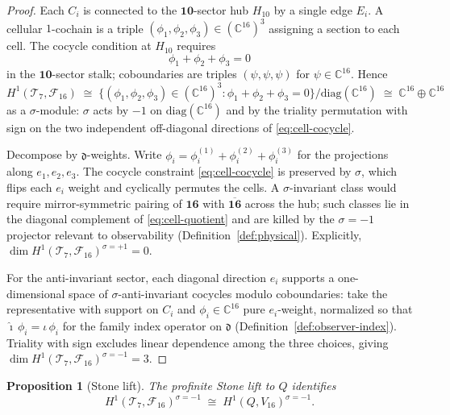 \documentclass[11pt]{article}
\theoremstyle{plain}
\newtheorem{proposition}[theorem]{Proposition}
\theoremstyle{definition}
\theoremstyle{remark}
\numberwithin{equation}{section}
\newcommand{\C}{\mathbb{C}}
\begin{document}
\begin{proof}
Each $C_i$ is connected to the $\mathbf{10}$-sector hub $H_{10}$ by a single
edge $E_i$. A cellular $1$-cochain is a triple
$(\phi_1,\phi_2,\phi_3)\in(\C^{16})^3$ assigning a section to each cell. The
cocycle condition at $H_{10}$ requires
\begin{equation}\label{eq:cell-cocycle}
  \phi_1+\phi_2+\phi_3=0
\end{equation}
in the $\mathbf{10}$-sector stalk; coboundaries are triples
$(\psi,\psi,\psi)$ for $\psi\in\C^{16}$. Hence
\begin{equation}\label{eq:cell-quotient}
  H^1(\mathcal{T}_7,\mathcal{F}_{16})
  \;\cong\;
  \bigl\{(\phi_1,\phi_2,\phi_3)\in(\C^{16})^3:\phi_1+\phi_2+\phi_3=0\bigr\}
  \big/\mathrm{diag}(\C^{16})
  \;\cong\;
  \C^{16}\oplus\C^{16}
\end{equation}
as a $\sigma$-module: $\sigma$ acts by $-1$ on $\mathrm{diag}(\C^{16})$ and
by the triality permutation with sign on the two independent off-diagonal
directions of \eqref{eq:cell-cocycle}.

Decompose by $\mathfrak{d}$-weights. Write
$\phi_i=\phi_i^{(1)}+\phi_i^{(2)}+\phi_i^{(3)}$ for the projections along
$e_1,e_2,e_3$. The cocycle constraint \eqref{eq:cell-cocycle} is preserved by
$\sigma$, which flips each $e_i$ weight and cyclically permutes the cells.
A $\sigma$-invariant class would require mirror-symmetric pairing of
$\mathbf{16}$ with $\overline{\mathbf{16}}$ across the hub; such classes lie in
the diagonal complement of \eqref{eq:cell-quotient} and are killed by the
$\sigma=-1$ projector relevant to observability
(Definition~\ref{def:physical}). Explicitly,
$\dim H^1(\mathcal{T}_7,\mathcal{F}_{16})^{\sigma=+1}=0$.

For the anti-invariant sector, each diagonal direction $e_i$ supports a
one-dimensional space of $\sigma$-anti-invariant cocycles modulo
coboundaries: take the representative with support on $C_i$ and
$\phi_i\in\C^{16}$ pure $e_i$-weight, normalized so that
$\hat{\imath}\,\phi_i=\iota\,\phi_i$ for the family index operator on
$\mathfrak{d}$ (Definition~\ref{def:observer-index}). Triality with sign
excludes linear dependence among the three choices, giving
$\dim H^1(\mathcal{T}_7,\mathcal{F}_{16})^{\sigma=-1}=3$.
\end{proof}

\begin{proposition}[Stone lift]\label{prop:stone-lift}
The profinite Stone lift to $Q$ identifies
\begin{equation}\label{eq:stone-lift}
  H^1(\mathcal{T}_7,\mathcal{F}_{16})^{\sigma=-1}
  \;\cong\;
  H^1(Q,V_{16})^{\sigma=-1}.
\end{equation}
\end{proposition}
\end{document}
